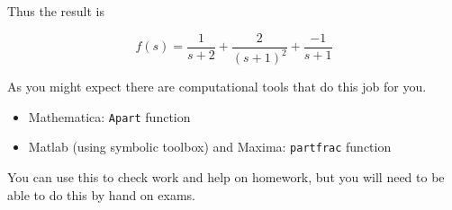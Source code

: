 \documentclass{article}
\begin{document}
Thus the result is

\[
f(s) = \frac{1}{s+2} + \frac{2}{(s+1)^2} + \frac{-1}{s+1}
\]

As you might expect there are computational tools that do this job for you.

\begin{itemize}
\item Mathematica: \texttt{Apart} function
\item Matlab (using symbolic toolbox) and Maxima: \texttt{partfrac} function
\end{itemize}

You can use this to check work and help on homework, but you will need to be able to do this by hand on exams.
\end{document}
